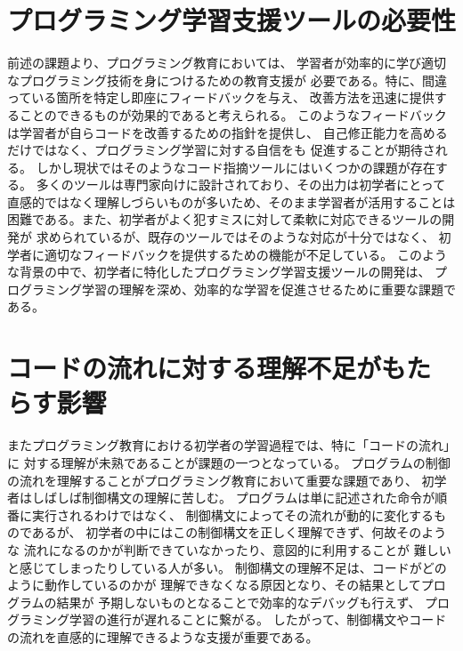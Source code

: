 \documentclass{cssspaper}
\begin{document}
        \section{プログラミング学習支援ツールの必要性}
        前述の課題より、プログラミング教育においては、
        学習者が効率的に学び適切なプログラミング技術を身につけるための教育支援が
        必要である。特に、間違っている箇所を特定し即座にフィードバックを与え、
        改善方法を迅速に提供することのできるものが効果的であると考えられる。
        このようなフィードバックは学習者が自らコードを改善するための指針を提供し、
        自己修正能力を高めるだけではなく、プログラミング学習に対する自信をも
        促進することが期待される。
        しかし現状ではそのようなコード指摘ツールにはいくつかの課題が存在する。
        多くのツールは専門家向けに設計されており、その出力は初学者にとって
        直感的ではなく理解しづらいものが多いため、そのまま学習者が活用することは
        困難である。また、初学者がよく犯すミスに対して柔軟に対応できるツールの開発が
        求められているが、既存のツールではそのような対応が十分ではなく、
        初学者に適切なフィードバックを提供するための機能が不足している。
        このような背景の中で、初学者に特化したプログラミング学習支援ツールの開発は、
        プログラミング学習の理解を深め、効率的な学習を促進させるために重要な課題である。

        \section{コードの流れに対する理解不足がもたらす影響}
        またプログラミング教育における初学者の学習過程では、特に「コードの流れ」に
        対する理解が未熟であることが課題の一つとなっている。
        プログラムの制御の流れを理解することがプログラミング教育において重要な課題であり、
        初学者はしばしば制御構文の理解に苦しむ。
        プログラムは単に記述された命令が順番に実行されるわけではなく、
        制御構文によってその流れが動的に変化するものであるが、
        初学者の中にはこの制御構文を正しく理解できず、何故そのような
        流れになるのかが判断できていなかったり、意図的に利用することが
        難しいと感じてしまったりしている人が多い。
        制御構文の理解不足は、コードがどのように動作しているのかが
        理解できなくなる原因となり、その結果としてプログラムの結果が
        予期しないものとなることで効率的なデバッグも行えず、
        プログラミング学習の進行が遅れることに繋がる。
        したがって、制御構文やコードの流れを直感的に理解できるような支援が重要である。
\end{document}
